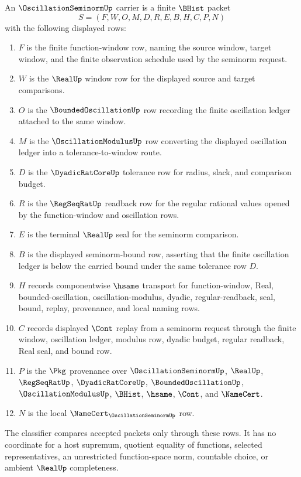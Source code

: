 \begin{definition}
\label{def:oscillation-seminorm-carrier}
An $\OscillationSeminormUp$ carrier is a finite $\BHist$ packet
$$
S=(F,W,O,M,D,R,E,B,H,C,P,N)
$$
with the following displayed rows:
\begin{enumerate}
\item $F$ is the finite function-window row, naming the source window, target window, and the finite observation schedule used by the seminorm request.
\item $W$ is the $\RealUp$ window row for the displayed source and target comparisons.
\item $O$ is the $\BoundedOscillationUp$ row recording the finite oscillation ledger attached to the same window.
\item $M$ is the $\OscillationModulusUp$ row converting the displayed oscillation ledger into a tolerance-to-window route.
\item $D$ is the $\DyadicRatCoreUp$ tolerance row for radius, slack, and comparison budget.
\item $R$ is the $\RegSeqRatUp$ readback row for the regular rational values opened by the function-window and oscillation rows.
\item $E$ is the terminal $\RealUp$ seal for the seminorm comparison.
\item $B$ is the displayed seminorm-bound row, asserting that the finite oscillation ledger is below the carried bound under the same tolerance row $D$.
\item $H$ records componentwise $\hsame$ transport for function-window, Real, bounded-oscillation, oscillation-modulus, dyadic, regular-readback, seal, bound, replay, provenance, and local naming rows.
\item $C$ records displayed $\Cont$ replay from a seminorm request through the finite window, oscillation ledger, modulus row, dyadic budget, regular readback, Real seal, and bound row.
\item $P$ is the $\Pkg$ provenance over $\OscillationSeminormUp$, $\RealUp$, $\RegSeqRatUp$, $\DyadicRatCoreUp$, $\BoundedOscillationUp$, $\OscillationModulusUp$, $\BHist$, $\hsame$, $\Cont$, and $\NameCert$.
\item $N$ is the local $\NameCert_{\OscillationSeminormUp}$ row.
\end{enumerate}
The classifier compares accepted packets only through these rows. It has no coordinate for a host supremum, quotient equality of functions, selected representatives, an unrestricted function-space norm, countable choice, or ambient $\RealUp$ completeness.
\end{definition}

